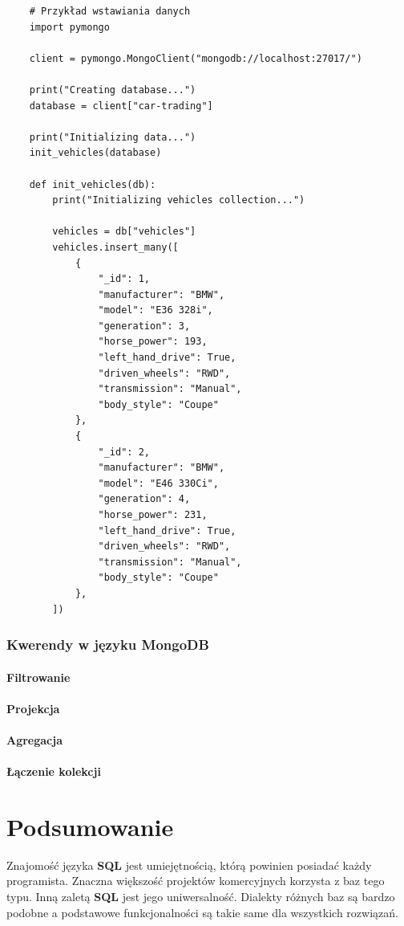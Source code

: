 \documentclass[a4paper,11pt]{article}
\begin{document}
\begin{verbatim}
    # Przykład wstawiania danych
    import pymongo

    client = pymongo.MongoClient("mongodb://localhost:27017/")

    print("Creating database...")
    database = client["car-trading"]

    print("Initializing data...")
    init_vehicles(database)

    def init_vehicles(db):
        print("Initializing vehicles collection...")

        vehicles = db["vehicles"]
        vehicles.insert_many([
            {
                "_id": 1,
                "manufacturer": "BMW",
                "model": "E36 328i",
                "generation": 3,
                "horse_power": 193,
                "left_hand_drive": True,
                "driven_wheels": "RWD",
                "transmission": "Manual",
                "body_style": "Coupe"
            },
            {
                "_id": 2,
                "manufacturer": "BMW",
                "model": "E46 330Ci",
                "generation": 4,
                "horse_power": 231,
                "left_hand_drive": True,
                "driven_wheels": "RWD",
                "transmission": "Manual",
                "body_style": "Coupe"
            },
        ])
\end{verbatim}

\section*{Kwerendy w języku MongoDB}
\subsection*{Filtrowanie}
\subsection*{Projekcja}
\subsection*{Agregacja}
\subsection*{Łączenie kolekcji}

\pagebreak
\part{Podsumowanie}
Znajomość języka \textbf{SQL} jest umiejętnością, którą powinien posiadać każdy programista. Znaczna większość projektów komercyjnych korzysta z baz tego typu.
Inną zaletą \textbf{SQL} jest jego uniwersalność. Dialekty różnych baz są bardzo podobne a podstawowe funkcjonalności są takie same dla wszystkich rozwiązań.
\end{document}
